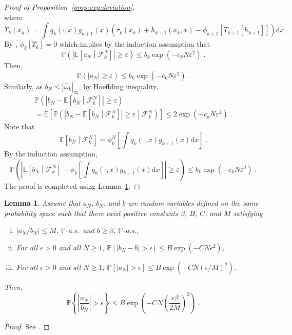 \documentclass[12pt]{article}
\newcommand{\rmd}{\mathrm{d}}
\newcommand{\eqsp}{\;}
\newcommand{\1}{\mathrm{1}}
\newtheorem{lemma}{Lemma}
\begin{document}
\begin{proof}[Proof of Proposition~\ref{prop:exp:deviation}]
\[\]
where
\[
\Upsilon_k(x_k) = \int q_{k}(\cdot,x)g_{k+1}(x)\left(\tau_k(x_k) + h_{k+1}(x_k,x) - \phi_{k+1}\left[T_{k+1}[h_{k+1}]\right]\right)\rmd x\eqsp.
\]
By \cite[Lemma~11]{olsson:westerborn:2016}, $\phi_{k}\left[\Upsilon_k\right] = 0$ which implies by the induction assumption that 
\[
\mathbb{P}\left(\left|\mathbb{E}\left[a_N\middle|\mathcal{F}_k^{N}\right]\right|\ge \varepsilon\right)\le b_k\exp\left(-c_kN\varepsilon^2\right)\eqsp.
\]
Then,
\[
\mathbb{P}\left(\left|a_N\right|\ge \varepsilon\right) \le b_k\exp\left(-c_kN\varepsilon^2\right)\eqsp.
\] 
Similarly, as $b_N \le |\widehat{\omega}_k|_{\infty}$, by Hoeffding inequality,
\begin{multline*}
\mathbb{P}\left(\left|b_N - \mathbb{E}\left[b_N\middle|\mathcal{F}_k^{N}\right]\right|\ge \varepsilon\right) \\
= \mathbb{E}\left[\mathbb{P}\left(\left|b_N - \mathbb{E}\left[b_N\middle|\mathcal{F}_k^{N}\right]\right|\ge \varepsilon\middle|\mathcal{F}_k^{N}\right)\right]\le 2\exp\left(-c_kN\varepsilon^2\right)\eqsp.
\end{multline*}
Note that
\[
\mathbb{E}\left[b_N\middle|\mathcal{F}_k^{N}\right] = \phi^N_{k}\left[\int q_{k}(\cdot,x)g_{k+1}(x)\rmd x\right]\eqsp.
\]
By  the induction assumption,
\[
\mathbb{P}\left(\left|\mathbb{E}\left[b_N\middle|\mathcal{F}_k^{N}\right]-\phi_k\left[\int q_{k}(\cdot,x)g_{k+1}(x)\rmd x\right]\right|\ge \varepsilon\right)\le b_k\exp\left(-c_kN\varepsilon^2\right)\eqsp.
\]
The proof is completed using Lemma~\ref{lem:hoeffding:ratio}.
\end{proof}


\begin{lemma}\label{lem:hoeffding:ratio}
Assume that $a_N$, $b_N$, and $b$ are random variables defined on the same probability space such that there exist positive constants $\beta$, $B$, $C$, and $M$ satisfying
\begin{enumerate}[(i)]
    \item $|a_N/b_N|\leq M$, $\mathbb{P}$-a.s.\ and  $b \geq \beta$, $\mathbb{P}$-a.s.,
    \item For all $\epsilon>0$ and all $N\geq1$, $\mathbb{P}\left[|b_N-b|>\epsilon \right]\leq B \exp\left(-C N \epsilon^2\right)$,
    \item For all $\epsilon>0$ and all $N\geq1$, $\mathbb{P} \left[ |a_N|>\epsilon \right]\leq B \exp\left(-C N \left(\epsilon/M\right)^2\right)$.
\end{enumerate}
Then,
$$
    \mathbb{P}\left\{ \left| \frac{a_N}{b_N} \right| > \epsilon \right\} \leq B \exp{\left(-C N \left(\frac{\epsilon \beta}{2M} \right)^2 \right)} \eqsp.
$$
\end{lemma}
\begin{proof}
See \cite{douc:garivier:moulines:olsson:2011}.
\end{proof}
\end{document}
